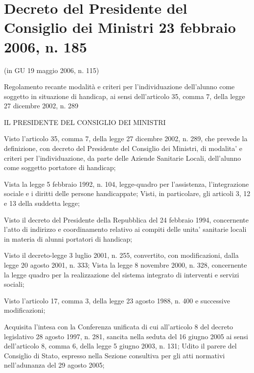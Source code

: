 \chapter[DPCM 23 febbraio 2006, n. 185]{Decreto del Presidente del Consiglio dei Ministri 23 febbraio 2006, n. 185}
\begin{center}
(in GU 19 maggio 2006, n. 115)
\end{center}

Regolamento recante modalità e criteri per l'individuazione dell'alunno come soggetto in situazione di handicap, ai sensi dell'articolo 35, comma 7, della legge 27 dicembre 2002, n. 289
\begin{center}
IL PRESIDENTE DEL CONSIGLIO DEI MINISTRI
\end{center}
Visto l'articolo 35, comma 7, della legge 27 dicembre 2002, n. 289, che prevede la definizione, con decreto del Presidente del Consiglio dei Ministri, di modalita' e criteri per l'individuazione, da parte delle Aziende Sanitarie Locali, dell'alunno come soggetto portatore di handicap;

Vista la legge 5 febbraio 1992, n. 104, legge-quadro per l'assistenza, l'integrazione sociale e i diritti delle persone handicappate;
Visti, in particolare, gli articoli 3, 12 e 13 della suddetta legge;

Visto il decreto del Presidente della Repubblica del 24 febbraio 1994, concernente l'atto di indirizzo e coordinamento relativo ai compiti delle unita' sanitarie locali in materia di alunni portatori di handicap;

Visto il decreto-legge 3 luglio 2001, n. 255, convertito, con modificazioni, dalla legge 20 agosto 2001, n. 333;
Vista la legge 8 novembre 2000, n. 328, concernente la legge quadro per la realizzazione del sistema integrato di interventi e servizi sociali;

Visto l'articolo 17, comma 3, della legge 23 agosto 1988, n. 400 e successive modificazioni;

Acquisita l'intesa con la Conferenza unificata di cui all'articolo 8 del decreto legislativo 28 agosto 1997, n. 281, sancita nella seduta del 16 giugno 2005 ai sensi dell'articolo 8, comma 6, della legge 5 giugno 2003, n. 131;
Udito il parere del Consiglio di Stato, espresso nella Sezione consultiva per gli atti normativi nell'adunanza del 29 agosto 2005;

